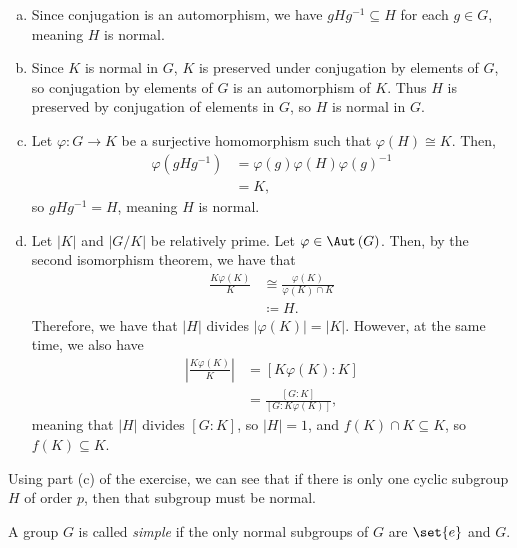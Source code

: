 \documentclass[10pt]{mypackage}
\begin{document}
\begin{solution}\hfill
  \begin{enumerate}[(a)]
    \item Since conjugation is an automorphism, we have $gHg^{-1}\subseteq H$ for each $g\in G$, meaning $H$ is normal.
    \item Since $K$ is normal in $G$, $K$ is preserved under conjugation by elements of $G$, so conjugation by elements of $G$ is an automorphism of $K$. Thus $H$ is preserved by conjugation of elements in $G$, so $H$ is normal in $G$.
    \item Let $\varphi\colon G\rightarrow K$ be a surjective homomorphism such that $\varphi(H)\cong K$. Then, 
      \begin{align*}
        \varphi\left( gHg^{-1} \right) &= \varphi\left( g \right)\varphi\left( H \right)\varphi\left( g \right)^{-1}\\
                                       &= K,
      \end{align*}
      so $gHg^{-1} = H$, meaning $H$ is normal.
    \item Let $\left\vert K \right\vert$ and $\left\vert G/K \right\vert$ be relatively prime. Let $\varphi\in \Aut\left( G \right)$. Then, by the second isomorphism theorem, we have that
      \begin{align*}
        \frac{K\varphi(K)}{K} &\cong \frac{\varphi(K)}{\varphi(K)\cap K}\\
                              &\coloneq H.
      \end{align*}
      Therefore, we have that $\left\vert H \right\vert$ divides $\left\vert \varphi(K) \right\vert = \left\vert K \right\vert$. However, at the same time, we also have
      \begin{align*}
        \left\vert \frac{K\varphi(K)}{K} \right\vert &= \left[ K\varphi(K):K \right]\\
                                                     &= \frac{\left[ G:K \right]}{\left[ G:K\varphi(K) \right]},
      \end{align*}
      meaning that $\left\vert H \right\vert$ divides $\left[ G:K \right]$, so $\left\vert H \right\vert = 1$, and $f(K)\cap K \subseteq K$, so $f(K)\subseteq K$.
  \end{enumerate}
\end{solution}
Using part (c) of the exercise, we can see that if there is only one cyclic subgroup $H$ of order $p$, then that subgroup must be normal.
\begin{definition}
  A group $G$ is called \textit{simple} if the only normal subgroups of $G$ are $\set{e}$ and $G$.
\end{definition}
\end{document}
